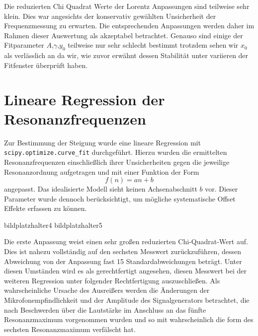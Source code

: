 \documentclass[11pt,a4paper]{article}
\begin{document}
Die reduzierten Chi Quadrat Werte der Lorentz Anpassungen sind teilweise sehr klein. Dies war angesichts der konservativ gewählten Unsicherheit der Frequenzmessung zu erwarten. Die entsprechenden Anpassungen werden daher im Rahmen dieser Auswertung als akzeptabel betrachtet. Genauso sind einige der Fitparameter $A$,$\gamma$,$y_0$  teilweise nur sehr schlecht bestimmt trotzdem sehen wir $x_0$ als verlässlich an da wir, wie zuvor erwähnt dessen Stabilität unter variieren der Fitfenster überprüft haben.

\section{Lineare Regression der Resonanzfrequenzen}

Zur Bestimmung der Steigung wurde eine lineare Regression mit \texttt{scipy.optimize.curve\_fit} durchgeführt. Hierzu wurden die ermittelten Resonanzfrequenzen einschließlich ihrer Unsicherheiten gegen die jeweilige Resonanzordnung aufgetragen und mit einer Funktion der Form
\begin{equation}
  f(n) = a n + b
  \label{eq:lineares-modell}
\end{equation}
angepasst. Das idealisierte Modell sieht keinen Achsenabschnitt $b$ vor. Dieser Parameter wurde dennoch berücksichtigt, um mögliche systematische Offset Effekte erfassen zu können.

bildplatzhalter{4}
bildplatzhalter{5}

\begin{table}[H]
  \centering
  \caption{Ergebnisse der ersten linearen Regression unter Berücksichtigung aller Resonanzfrequenzen.}
  \label{tab:regression1}
  \vspace{0.4em}
  \par\vspace{0.5em}
\end{table}

Die erste Anpassung weist einen sehr großen reduzierten Chi-Quadrat-Wert auf. Dies ist nahezu vollständig auf den sechsten Messwert zurückzuführen, dessen Abweichung von der Anpassung fast 15 Standardabweichungen beträgt. Unter diesen Umständen wird es als gerechtfertigt angesehen, diesen Messwert bei der weiteren Regression unter folgender Rechtfertigung auszuschließen. Als wahrscheinliche Ursache des Ausreißers werden die Änderungen der Mikrofonempfindlichkeit und der Amplitude des Signalgenerators betrachtet, die nach Beschwerden über die Lautstärke im Anschluss an das fünfte Resonanzmaximum vorgenommen wurden und so mit wahrscheinlich die form des sechsten Resonanzmaximum verfälscht hat.
\end{document}
